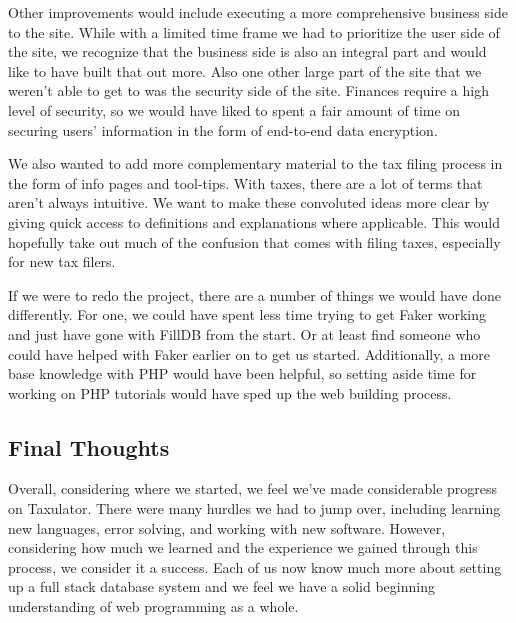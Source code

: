 \documentclass[sigconf]{acmart}
\begin{document}
Other improvements would include executing a more comprehensive business side to the site. While with a limited time frame we had to prioritize the user side of the site, we recognize that the business side is also an integral part and would like to have built that out more. Also one other large part of the site that we weren't able to get to was the security side of the site. Finances require a high level of security, so we would have liked to spent a fair amount of time on securing users' information in the form of end-to-end data encryption.

We also wanted to add more complementary material to the tax filing process in the form of info pages and tool-tips. With taxes, there are a lot of terms that aren't always intuitive. We want to make these convoluted ideas more clear by giving quick access to definitions and explanations where applicable. This would hopefully take out much of the confusion that comes with filing taxes, especially for new tax filers.

If we were to redo the project, there are a number of things we would have done differently. For one, we could have spent less time trying to get Faker working and just have gone with FillDB from the start. Or at least find someone who could have helped with Faker earlier on to get us started. Additionally, a more base knowledge with PHP would have been helpful, so setting aside time for working on PHP tutorials would have sped up the web building process.

\subsection{Final Thoughts}
Overall, considering where we started, we feel we've made considerable progress on Taxulator. There were many hurdles we had to jump over, including learning new languages, error solving, and working with new software. However, considering how much we learned and the experience we gained through this process, we consider it a success. Each of us now know much more about setting up a full stack database system and we feel we have a solid beginning understanding of web programming as a whole.




\end{document}
